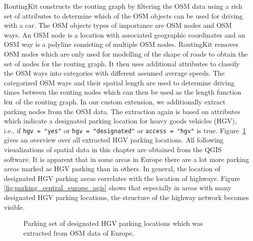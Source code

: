 RoutingKit constructs the routing graph by filtering the OSM data using a rich set of attributes to determine which of the OSM objects can be used for driving with a car. The OSM objects types of importance are OSM nodes and OSM ways. An OSM node is a location with associated geographic coordinates and an OSM way is a polyline consisting of multiple OSM nodes. RoutingKit removes OSM nodes which are only used for modelling of the shape of roads to obtain the set of nodes for the routing graph. It then uses additional attributes to classify the OSM ways into categories with different assumed average speeds. The categorized OSM ways and their spatial length are used to determine driving times between the routing nodes which can then be used as the length function $\operatorname{len}$ of the routing graph. In our custom extension, we additionally extract parking nodes from the OSM data. The extraction again is based on attributes which indicate a designated parking location for heavy goods vehicles (HGV), i.e., if \texttt{hgv = "yes"} or \texttt{hgv = "designated"} or \texttt{access = "hgv"} is true. Figure~\ref{fig:parking_qgis} gives an overview over all extracted HGV parking locations. All following visualizations of spatial data in this chapter are obtained from the QGIS software\cite{qgisdevelopmentteam:2022}. It is apparent that in some areas in Europe there are a lot more parking areas marked as HGV parking than in others. In general, the location of designated HGV parking areas correlates with the location of highways. Figure \ref{fig:parking_central_europe_qgis} shows that especially in areas with many designated HGV parking locations, the structure of the highway network becomes visible.

\begin{figure}[hbtp]
	\centering
	\hfill
	\caption{Parking set of designated HGV parking locations which was extracted from OSM data of Europe.}
	\label{fig:parking_qgis}
\end{figure}

